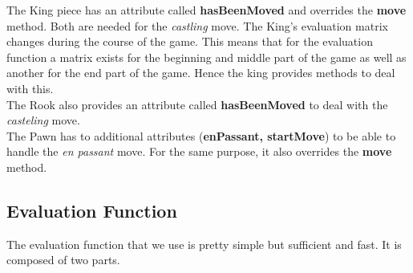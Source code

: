 \documentclass[final, paper=a4, paper=portrait, pagesize=auto, fontsize=10pt,english]{scrartcl}
\begin{document}
The King piece has an attribute called \textbf{hasBeenMoved} and overrides the \textbf{move} method. Both are needed for the \textit{castling} move. The King's evaluation matrix changes during the course of the game. This means that for the evaluation function a matrix exists for the beginning and middle part of the game as well as another for the end part of the game. Hence the king provides methods to deal with this. \\

The Rook also provides an attribute called \textbf{hasBeenMoved} to deal with the \textit{casteling} move.\\

The Pawn has to additional attributes (\textbf{enPassant, startMove}) to be able to handle the \textit{en passant} move. For the same purpose, it also overrides the \textbf{move} method.

\subsection{Evaluation Function}
The evaluation function that we use is pretty simple but sufficient and fast. It is composed of two parts.
\end{document}
